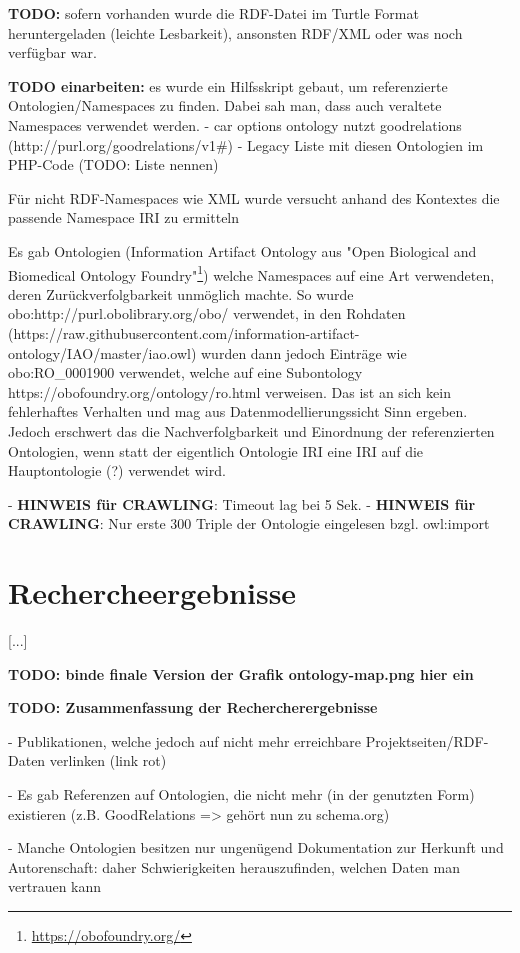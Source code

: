 \documentclass{article}
\begin{document}
\textbf{TODO:} sofern vorhanden wurde die RDF-Datei im Turtle Format heruntergeladen (leichte Lesbarkeit), ansonsten RDF/XML oder was noch verfügbar war.

\textbf{TODO einarbeiten:} es wurde ein Hilfsskript gebaut, um referenzierte Ontologien/Namespaces zu finden. Dabei sah man, dass auch veraltete Namespaces verwendet werden.
- car options ontology nutzt goodrelations (http://purl.org/goodrelations/v1\#) - Legacy Liste mit diesen Ontologien im PHP-Code (TODO: Liste nennen)

Für nicht RDF-Namespaces wie XML wurde versucht anhand des Kontextes die passende Namespace IRI zu ermitteln

Es gab Ontologien (Information Artifact Ontology aus "Open Biological and Biomedical Ontology Foundry"\footnote{\url{https://obofoundry.org/}}) welche Namespaces auf eine Art verwendeten, deren Zurückverfolgbarkeit unmöglich machte.
So wurde obo:http://purl.obolibrary.org/obo/ verwendet, in den Rohdaten (https://raw.githubusercontent.com/information-artifact-ontology/IAO/master/iao.owl) wurden dann jedoch Einträge wie obo:RO\_0001900 verwendet, welche auf eine Subontology https://obofoundry.org/ontology/ro.html verweisen.
Das ist an sich kein fehlerhaftes Verhalten und mag aus Datenmodellierungssicht Sinn ergeben.
Jedoch erschwert das die Nachverfolgbarkeit und Einordnung der referenzierten Ontologien, wenn statt der eigentlich Ontologie IRI eine IRI auf die Hauptontologie (?) verwendet wird.

- \textbf{HINWEIS für CRAWLING}: Timeout lag bei 5 Sek.
- \textbf{HINWEIS für CRAWLING}: Nur erste 300 Triple der Ontologie eingelesen bzgl. owl:import

\section{Rechercheergebnisse}

[...]

\textbf{TODO: binde finale Version der Grafik ontology-map.png hier ein}

\textbf{TODO: Zusammenfassung der Rechercherergebnisse}

- Publikationen, welche jedoch auf nicht mehr erreichbare Projektseiten/RDF-Daten verlinken (link rot)

- Es gab Referenzen auf Ontologien, die nicht mehr (in der genutzten Form) existieren (z.B. GoodRelations => gehört nun zu schema.org)

- Manche Ontologien besitzen nur ungenügend Dokumentation zur Herkunft und Autorenschaft: daher Schwierigkeiten herauszufinden, welchen Daten man vertrauen kann
\end{document}
